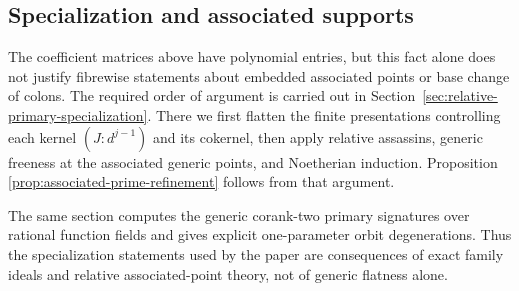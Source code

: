 \subsection{Specialization and associated supports}

The coefficient matrices above have polynomial entries, but this fact
alone does not justify fibrewise statements about embedded associated
points or base change of colons.  The required order of argument is
carried out in Section~\ref{sec:relative-primary-specialization}.
There we first flatten the finite presentations controlling each
kernel \((J:d^{j-1})\) and its cokernel, then apply relative
assassins, generic freeness at the associated generic points, and
Noetherian induction.  Proposition
\ref{prop:associated-prime-refinement} follows from that argument.

The same section computes the generic corank-two primary signatures
over rational function fields and gives explicit one-parameter orbit
degenerations.  Thus the specialization statements used by the paper
are consequences of exact family ideals and relative associated-point
theory, not of generic flatness alone.
